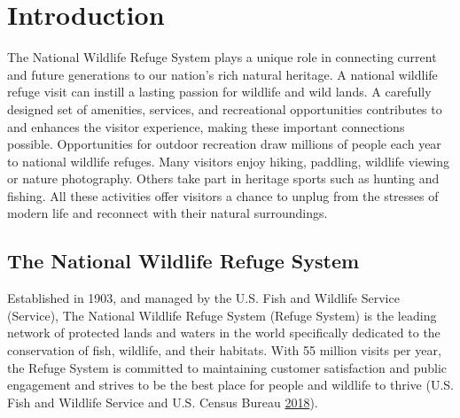 \documentclass[]{book}
\begin{document}
\chapter{Introduction}\label{intro}

The National Wildlife Refuge System plays a unique role in connecting
current and future generations to our nation's rich natural heritage. A
national wildlife refuge visit can instill a lasting passion for
wildlife and wild lands. A carefully designed set of amenities,
services, and recreational opportunities contributes to and enhances the
visitor experience, making these important connections possible.
Opportunities for outdoor recreation draw millions of people each year
to national wildlife refuges. Many visitors enjoy hiking, paddling,
wildlife viewing or nature photography. Others take part in heritage
sports such as hunting and fishing. All these activities offer visitors
a chance to unplug from the stresses of modern life and reconnect with
their natural surroundings.

\section{The National Wildlife Refuge
System}\label{the-national-wildlife-refuge-system}

Established in 1903, and managed by the U.S. Fish and Wildlife Service
(Service), The National Wildlife Refuge System (Refuge System) is the
leading network of protected lands and waters in the world specifically
dedicated to the conservation of fish, wildlife, and their habitats.
With 55 million visits per year, the Refuge System is committed to
maintaining customer satisfaction and public engagement and strives to
be the best place for people and wildlife to thrive (U.S. Fish and
Wildlife Service and U.S. Census Bureau
\protect\hyperlink{ref-USFWS2018}{2018}).
\end{document}
